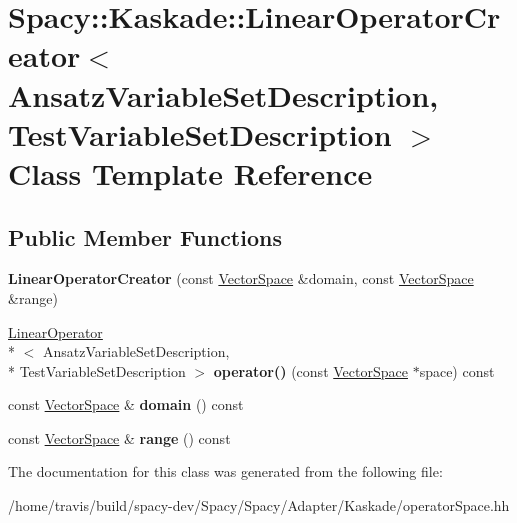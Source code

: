 \hypertarget{classSpacy_1_1Kaskade_1_1LinearOperatorCreator}{\section{Spacy\-:\-:Kaskade\-:\-:Linear\-Operator\-Creator$<$ Ansatz\-Variable\-Set\-Description, Test\-Variable\-Set\-Description $>$ Class Template Reference}
\label{classSpacy_1_1Kaskade_1_1LinearOperatorCreator}
}
\subsection*{Public Member Functions}
\begin{DoxyCompactItemize}
\item 
\hypertarget{classSpacy_1_1Kaskade_1_1LinearOperatorCreator_a3cc4089037dcdf7e896b95d19063f56a}{{\bfseries Linear\-Operator\-Creator} (const \hyperlink{classSpacy_1_1VectorSpace}{Vector\-Space} \&domain, const \hyperlink{classSpacy_1_1VectorSpace}{Vector\-Space} \&range)}\label{classSpacy_1_1Kaskade_1_1LinearOperatorCreator_a3cc4089037dcdf7e896b95d19063f56a}

\item 
\hypertarget{classSpacy_1_1Kaskade_1_1LinearOperatorCreator_a7897a3843021097021854f7e1fcd938f}{\hyperlink{classSpacy_1_1Kaskade_1_1LinearOperator}{Linear\-Operator}\\*
$<$ Ansatz\-Variable\-Set\-Description, \\*
Test\-Variable\-Set\-Description $>$ {\bfseries operator()} (const \hyperlink{classSpacy_1_1VectorSpace}{Vector\-Space} $\ast$space) const }\label{classSpacy_1_1Kaskade_1_1LinearOperatorCreator_a7897a3843021097021854f7e1fcd938f}

\item 
\hypertarget{classSpacy_1_1Kaskade_1_1LinearOperatorCreator_ae5a94e31d885dcf4526737e5ab60e91a}{const \hyperlink{classSpacy_1_1VectorSpace}{Vector\-Space} \& {\bfseries domain} () const }\label{classSpacy_1_1Kaskade_1_1LinearOperatorCreator_ae5a94e31d885dcf4526737e5ab60e91a}

\item 
\hypertarget{classSpacy_1_1Kaskade_1_1LinearOperatorCreator_ae36b9e5b49159981d712a1d7193f52f8}{const \hyperlink{classSpacy_1_1VectorSpace}{Vector\-Space} \& {\bfseries range} () const }\label{classSpacy_1_1Kaskade_1_1LinearOperatorCreator_ae36b9e5b49159981d712a1d7193f52f8}

\end{DoxyCompactItemize}


The documentation for this class was generated from the following file\-:\begin{DoxyCompactItemize}
\item 
/home/travis/build/spacy-\/dev/\-Spacy/\-Spacy/\-Adapter/\-Kaskade/operator\-Space.\-hh\end{DoxyCompactItemize}
